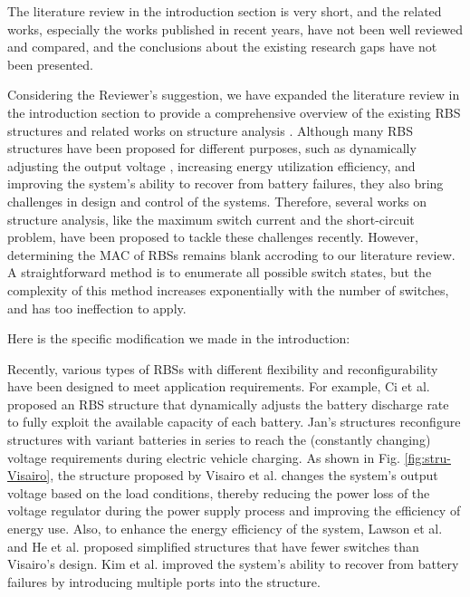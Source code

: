 \begin{revcomment}
  The literature review in the introduction section is very short, and the related works, especially the works published in recent years, have not been well reviewed and compared, and the conclusions about the existing research gaps have not been presented.
\end{revcomment}
\begin{revresponse}

Considering the Reviewer's suggestion, we have expanded the literature review in the introduction section to provide a comprehensive overview of the existing RBS structures \cite{ci2007novel,9209774,engelhardt2021double,visairoReconfigurableBatteryPack2008,lawsonSoftwareConfigurableBattery2012,he2014reconfiguration,kim2009dynamic} and related works on structure analysis \cite{han2021analysis,chenSneakCircuitTheory2021}. 
Although many RBS structures have been proposed for different purposes, such as dynamically adjusting the output voltage , increasing energy utilization efficiency, and improving the system's ability to recover from battery failures, they also bring challenges in design and control of the systems.
Therefore, several works on structure analysis, like the maximum switch current and the short-circuit problem, have been proposed to tackle these challenges recently.
However, determining the MAC of RBSs remains blank accroding to our literature review.
A straightforward method is to enumerate all possible switch states, but the complexity of this method increases exponentially with the number of switches, and has too ineffection to apply.


Here is the specific modification we made in the introduction:
\begin{changes}
Recently, various types of RBSs with different flexibility and reconfigurability have been designed to meet application requirements. 
For example, Ci et al. \cite{ci2007novel} proposed an RBS structure that dynamically adjusts the battery discharge rate to fully exploit the available capacity of each battery. 
Jan's \cite{9209774,engelhardt2021double} structures  reconfigure structures with variant batteries in series to reach the (constantly changing) voltage requirements during electric vehicle charging.
As shown in Fig. \ref{fig:stru-Visairo}, the structure proposed by Visairo et al. \cite{visairoReconfigurableBatteryPack2008}  changes the system's output voltage based on the load conditions, thereby reducing the power loss of the voltage regulator during the power supply process and improving the efficiency of energy use. 
Also, to enhance the energy efficiency of the system, Lawson et al. \cite{lawsonSoftwareConfigurableBattery2012} and He et al. \cite{he2014reconfiguration}  proposed simplified structures that have fewer switches than Visairo's design.
Kim et al. \cite{kim2009dynamic} improved the system's ability to recover from battery failures by introducing multiple ports into the structure. 



\end{changes}
\end{revresponse}
